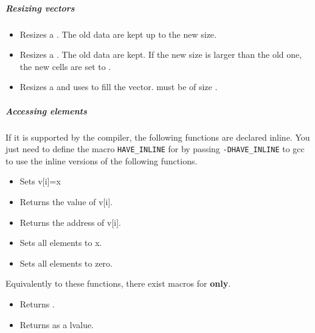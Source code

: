 \subparagraph{Resizing vectors}
\begin{itemize}
\item {}
  \sshortdescribe Resizes a . The old data are kept up to
  the new size.
\item {} 
  \sshortdescribe Resizes a .  The old data are kept. If
  the new size is larger than the old one, the new cells are set to .
\item {} 
  \sshortdescribe Resizes a  and uses  to fill the
  vector.  must be of size .
\end{itemize}  

\subparagraph{Accessing elements}

If it is supported by the compiler, the following functions are declared
inline. You just need to define the macro \verb!HAVE_INLINE! for by passing
\verb!-DHAVE_INLINE! to gcc to use the inline versions of the following
functions.
\begin{itemize}
\item {}
  \sshortdescribe Sets v[i]=x  
\item {}
  \sshortdescribe Returns the value of v[i].  
\item {}
  \sshortdescribe Returns the address of v[i].  
\item {}
  \sshortdescribe Sets all elements to x.  
\item {}
  \sshortdescribe Sets all elements to zero.  
\end{itemize}
Equivalently to these functions, there exist macros for {\bf {} only}.
\begin{itemize}
\item {}
  \sshortdescribe Returns .
  
\item {}
  \sshortdescribe Returns  as a lvalue.
\end{itemize}


